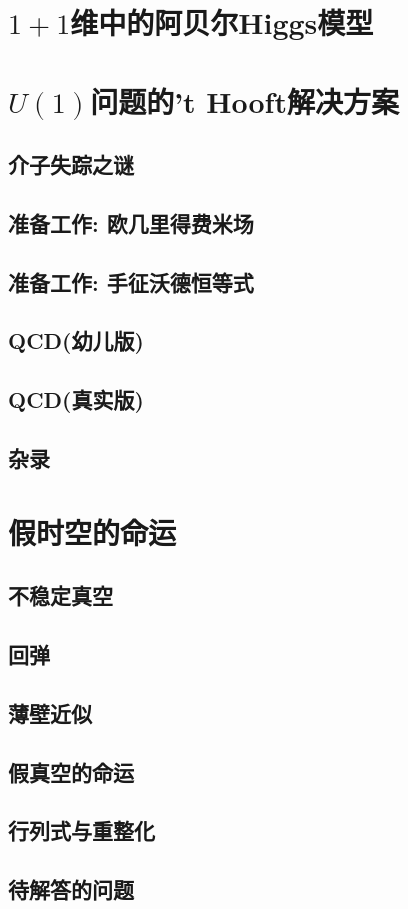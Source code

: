 \section{$1+1$维中的阿贝尔Higgs模型}



\section{$U(1)$问题的't Hooft解决方案}

\subsection{介子失踪之谜}

\subsection{准备工作: 欧几里得费米场}

\subsection{准备工作: 手征沃德恒等式}

\subsection{QCD(幼儿版)}


\subsection{QCD(真实版)}

\subsection{杂录}


\section{假时空的命运}

\subsection{不稳定真空}

\subsection{回弹}

\subsection{薄壁近似}

\subsection{假真空的命运}

\subsection{行列式与重整化}

\subsection{待解答的问题}